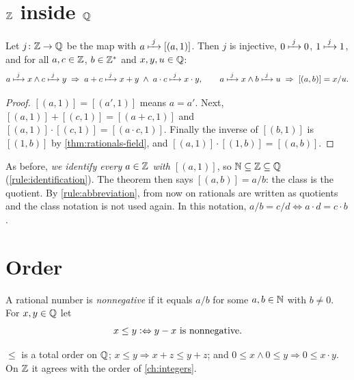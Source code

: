 \section{\texorpdfstring{$\mathbb{Z}$}{Z} inside \texorpdfstring{$\Q$}{Q}}

\begin{theorem}[Embedding]
\label{thm:rationals-embedding}
Let $j \colon \mathbb{Z} \to \mathbb{Q}$ be the map with $a \xmapsto{\;j\;} [(a, 1)]$. Then $j$ is
injective, $0 \xmapsto{\;j\;} 0$, $1 \xmapsto{\;j\;} 1$, and for all $a, c \in \mathbb{Z}$, $b \in
\mathbb{Z}^\ast$ and $x, y, u \in \mathbb{Q}$:
\[
  a \xmapsto{\;j\;} x \land c \xmapsto{\;j\;} y \;\Rightarrow\; a + c \xmapsto{\;j\;} x + y \;\land\; a
  \cdot c \xmapsto{\;j\;} x \cdot y,
  \qquad
  a \xmapsto{\;j\;} x \land b \xmapsto{\;j\;} u \;\Rightarrow\; [(a, b)] = x / u.
\]
\end{theorem}

\begin{proof}
$[(a, 1)] = [(a', 1)]$ means $a = a'$. Next, $[(a, 1)] + [(c, 1)] = [(a + c, 1)]$
and $[(a, 1)] \cdot [(c, 1)] = [(a \cdot c, 1)]$. Finally the inverse of $[(b,
1)]$ is $[(1, b)]$ by \cref{thm:rationals-field}, and $[(a, 1)] \cdot [(1, b)] =
[(a, b)]$.
\end{proof}

As before, \emph{we identify every $a \in \mathbb{Z}$ with $[(a, 1)]$}, so $\mathbb{N} \subseteq \mathbb{Z}
\subseteq \mathbb{Q}$ (\cref{rule:identification}). The theorem then says $[(a, b)] = a /
b$: the class is the quotient. By \cref{rule:abbreviation}, from now on rationals
are written as quotients and the class notation is not used again. In this
notation, $a / b = c / d \Leftrightarrow a \cdot d = c \cdot b$.

\section{Order}

\begin{definition}[Order on $\Q$]
\label{def:rational-order}
A rational number is \emph{nonnegative} if it equals $a / b$ for some $a, b \in \mathbb{N}$
with $b \neq 0$. For $x, y \in \mathbb{Q}$ let
\[
  x \le y \mathrel{\vcentcolon\Leftrightarrow} y - x \text{ is nonnegative}.
\]
\end{definition}

\begin{theorem}
\label{thm:rationals-ordered}
$\le$ is a total order on $\Q$; $x \le y \Rightarrow x + z \le y + z$; and $0 \le
x \land 0 \le y \Rightarrow 0 \le x \cdot y$. On $\mathbb{Z}$ it agrees with the order of
\cref{ch:integers}.
\end{theorem}

